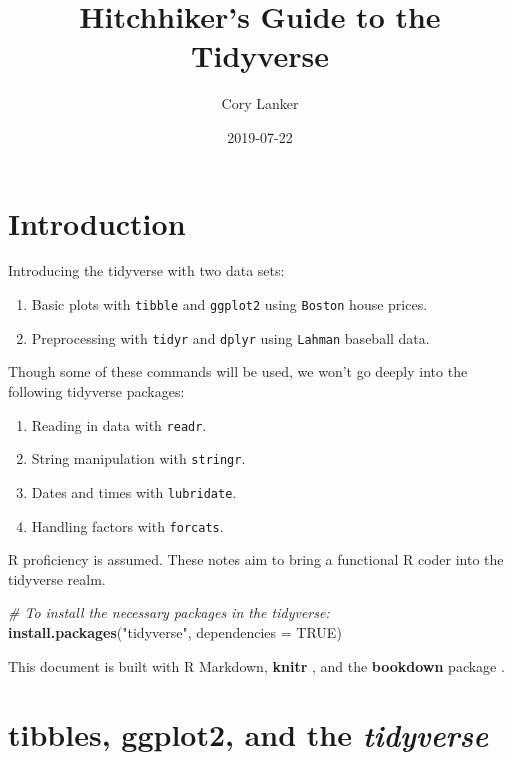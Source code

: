 \documentclass[]{book}
\title{Hitchhiker's Guide to the Tidyverse}
\author{Cory Lanker}
\date{2019-07-22}
\newenvironment{Shaded}{\begin{snugshade}}{\end{snugshade}}
\newcommand{\KeywordTok}[1]{\textcolor[rgb]{0.13,0.29,0.53}{\textbf{#1}}}
\newcommand{\DataTypeTok}[1]{\textcolor[rgb]{0.13,0.29,0.53}{#1}}
\newcommand{\StringTok}[1]{\textcolor[rgb]{0.31,0.60,0.02}{#1}}
\newcommand{\CommentTok}[1]{\textcolor[rgb]{0.56,0.35,0.01}{\textit{#1}}}
\newcommand{\OtherTok}[1]{\textcolor[rgb]{0.56,0.35,0.01}{#1}}
\newcommand{\NormalTok}[1]{#1}
\providecommand{\tightlist}{%
  \setlength{\itemsep}{0pt}\setlength{\parskip}{0pt}}
\begin{document}
\maketitle

{
\setcounter{tocdepth}{1}
\tableofcontents
}
\chapter*{Introduction}\label{introduction}

Introducing the tidyverse with two data sets:

\begin{enumerate}
\def\labelenumi{\arabic{enumi}.}
\tightlist
\item
  Basic plots with \texttt{tibble} and \texttt{ggplot2} using
  \texttt{Boston} house prices.
\item
  Preprocessing with \texttt{tidyr} and \texttt{dplyr} using
  \texttt{Lahman} baseball data.
\end{enumerate}

Though some of these commands will be used, we won't go deeply into the
following tidyverse packages:

\begin{enumerate}
\def\labelenumi{\arabic{enumi}.}
\tightlist
\item
  Reading in data with \texttt{readr}.
\item
  String manipulation with \texttt{stringr}.
\item
  Dates and times with \texttt{lubridate}.
\item
  Handling factors with \texttt{forcats}.
\end{enumerate}

R proficiency is assumed. These notes aim to bring a functional R coder
into the tidyverse realm.

\begin{Shaded}
\begin{Highlighting}[]
\CommentTok{# To install the necessary packages in the tidyverse:}
\KeywordTok{install.packages}\NormalTok{(}\StringTok{"tidyverse"}\NormalTok{, }\DataTypeTok{dependencies =} \OtherTok{TRUE}\NormalTok{)}
\end{Highlighting}
\end{Shaded}

This document is built with R Markdown, \textbf{knitr} \citep{xie2015},
and the \textbf{bookdown} package \citep{R-bookdown}.

\chapter{\texorpdfstring{tibbles, ggplot2, and the
\emph{tidyverse}}{tibbles, ggplot2, and the tidyverse}}\label{ch:intro}
\end{document}
